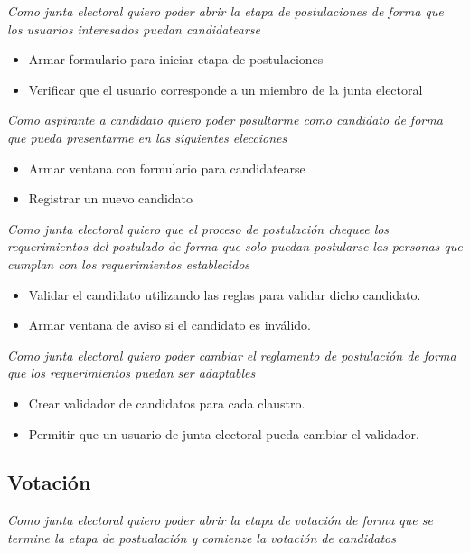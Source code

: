 \textsl{Como junta electoral quiero poder abrir la etapa de postulaciones de forma que los usuarios interesados puedan candidatearse}

\begin{itemize}
 \item Armar formulario para iniciar etapa de postulaciones
 \item Verificar que el usuario corresponde a un miembro de la junta electoral
\end{itemize}

\medskip

\textsl{Como aspirante a candidato quiero poder posultarme como candidato de forma que pueda presentarme en las siguientes elecciones}
\begin{itemize}
 \item Armar ventana con formulario para candidatearse
 \item Registrar un nuevo candidato
\end{itemize}

\medskip

\textsl{Como junta electoral quiero que el proceso de postulaci\'on chequee los requerimientos del postulado de forma que solo puedan postularse las personas que cumplan con los requerimientos establecidos}
\begin{itemize}
 \item Validar el candidato utilizando las reglas para validar dicho candidato.
 \item Armar ventana de aviso si el candidato es inv\'alido.
\end{itemize}

\medskip

\textsl{Como junta electoral quiero poder cambiar el reglamento de postulaci\'on de forma que los requerimientos puedan ser adaptables}
\begin{itemize}
 \item Crear validador de candidatos para cada claustro.
 \item Permitir que un usuario de junta electoral pueda cambiar el validador.
\end{itemize}

\bigskip

\subsection*{Votaci\'on}

\textsl{Como junta electoral quiero poder abrir la etapa de votaci\'on de forma que se termine la etapa de postualaci\'on y comienze la votaci\'on de candidatos}

